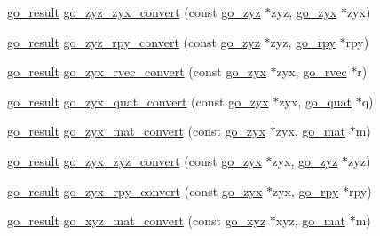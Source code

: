 \begin{DoxyCompactItemize}
\item 
\hyperlink{gotypes_8h_a55d48b38cd959f63c7e8db8337a9792a}{go\-\_\-result} \hyperlink{namespacegomotion_a132d8bf451632c63d152a70ac9e55824}{go\-\_\-zyz\-\_\-zyx\-\_\-convert} (const \hyperlink{structgomotion_1_1go__zyz}{go\-\_\-zyz} $\ast$zyz, \hyperlink{structgomotion_1_1go__zyx}{go\-\_\-zyx} $\ast$zyx)
\item 
\hyperlink{gotypes_8h_a55d48b38cd959f63c7e8db8337a9792a}{go\-\_\-result} \hyperlink{namespacegomotion_a186e9aa386fc471351cc8f3d819730f7}{go\-\_\-zyz\-\_\-rpy\-\_\-convert} (const \hyperlink{structgomotion_1_1go__zyz}{go\-\_\-zyz} $\ast$zyz, \hyperlink{structgomotion_1_1go__rpy}{go\-\_\-rpy} $\ast$rpy)
\item 
\hyperlink{gotypes_8h_a55d48b38cd959f63c7e8db8337a9792a}{go\-\_\-result} \hyperlink{namespacegomotion_a9c449c8dc1828671f0acc40ace796d68}{go\-\_\-zyx\-\_\-rvec\-\_\-convert} (const \hyperlink{structgomotion_1_1go__zyx}{go\-\_\-zyx} $\ast$zyx, \hyperlink{structgomotion_1_1go__rvec}{go\-\_\-rvec} $\ast$r)
\item 
\hyperlink{gotypes_8h_a55d48b38cd959f63c7e8db8337a9792a}{go\-\_\-result} \hyperlink{namespacegomotion_a0f27fd09f8d74304db6e9ca8185a9623}{go\-\_\-zyx\-\_\-quat\-\_\-convert} (const \hyperlink{structgomotion_1_1go__zyx}{go\-\_\-zyx} $\ast$zyx, \hyperlink{structgomotion_1_1go__quat}{go\-\_\-quat} $\ast$q)
\item 
\hyperlink{gotypes_8h_a55d48b38cd959f63c7e8db8337a9792a}{go\-\_\-result} \hyperlink{namespacegomotion_a70010a8b112dc746b53c5e8e6afa9637}{go\-\_\-zyx\-\_\-mat\-\_\-convert} (const \hyperlink{structgomotion_1_1go__zyx}{go\-\_\-zyx} $\ast$zyx, \hyperlink{structgomotion_1_1go__mat}{go\-\_\-mat} $\ast$m)
\item 
\hyperlink{gotypes_8h_a55d48b38cd959f63c7e8db8337a9792a}{go\-\_\-result} \hyperlink{namespacegomotion_a586afaa4f9497b0525555968aa3ae0b5}{go\-\_\-zyx\-\_\-zyz\-\_\-convert} (const \hyperlink{structgomotion_1_1go__zyx}{go\-\_\-zyx} $\ast$zyx, \hyperlink{structgomotion_1_1go__zyz}{go\-\_\-zyz} $\ast$zyz)
\item 
\hyperlink{gotypes_8h_a55d48b38cd959f63c7e8db8337a9792a}{go\-\_\-result} \hyperlink{namespacegomotion_a484efc550824656f71a960fc3cab296d}{go\-\_\-zyx\-\_\-rpy\-\_\-convert} (const \hyperlink{structgomotion_1_1go__zyx}{go\-\_\-zyx} $\ast$zyx, \hyperlink{structgomotion_1_1go__rpy}{go\-\_\-rpy} $\ast$rpy)
\item 
\hyperlink{gotypes_8h_a55d48b38cd959f63c7e8db8337a9792a}{go\-\_\-result} \hyperlink{namespacegomotion_adb2a7f9cf2609a75afa30093009c58f9}{go\-\_\-xyz\-\_\-mat\-\_\-convert} (const \hyperlink{structgomotion_1_1go__xyz}{go\-\_\-xyz} $\ast$xyz, \hyperlink{structgomotion_1_1go__mat}{go\-\_\-mat} $\ast$m)

\end{DoxyCompactItemize}
